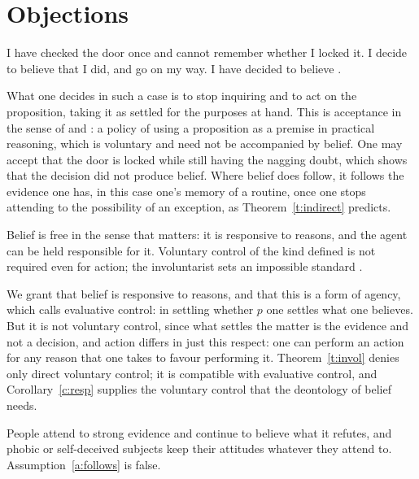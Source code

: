 \documentclass{situationist-preprint}
\begin{document}
\section{Objections}

\begin{objection}
I have checked the door once and cannot remember whether I locked it. I decide to believe that I did, and go on my way. I have decided to believe \citep{Ginet2001}.
\end{objection}

\begin{reply}
What one decides in such a case is to stop inquiring and to act on the proposition, taking it as settled for the purposes at hand. This is acceptance in the sense of \citet{Cohen1992} and \citet{Bratman1992}: a policy of using a proposition as a premise in practical reasoning, which is voluntary and need not be accompanied by belief. One may accept that the door is locked while still having the nagging doubt, which shows that the decision did not produce belief. Where belief does follow, it follows the evidence one has, in this case one's memory of a routine, once one stops attending to the possibility of an exception, as Theorem~\ref{t:indirect} predicts.
\end{reply}

\begin{objection}
Belief is free in the sense that matters: it is responsive to reasons, and the agent can be held responsible for it. Voluntary control of the kind defined is not required even for action; the involuntarist sets an impossible standard \citep{Steup2008}.
\end{objection}

\begin{reply}
We grant that belief is responsive to reasons, and that this is a form of agency, which \citet{Hieronymi2006} calls evaluative control: in settling whether $p$ one settles what one believes. But it is not voluntary control, since what settles the matter is the evidence and not a decision, and action differs in just this respect: one can perform an action for any reason that one takes to favour performing it. Theorem~\ref{t:invol} denies only direct voluntary control; it is compatible with evaluative control, and Corollary~\ref{c:resp} supplies the voluntary control that the deontology of belief needs.
\end{reply}

\begin{objection}
People attend to strong evidence and continue to believe what it refutes, and phobic or self-deceived subjects keep their attitudes whatever they attend to. Assumption~\ref{a:follows} is false.
\end{objection}
\end{document}
